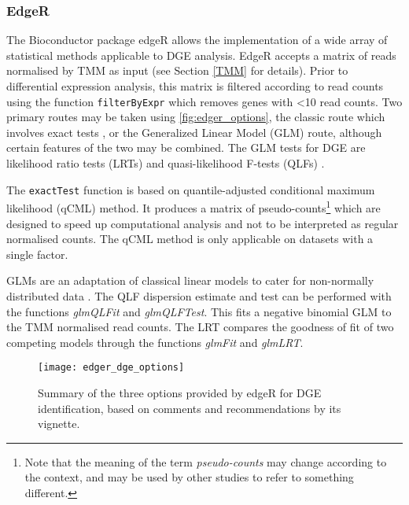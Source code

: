 \subsubsection{EdgeR}

The Bioconductor package edgeR allows the implementation of a wide array of statistical methods applicable to \ac{DGE} analysis. EdgeR accepts a matrix of reads normalised by \ac{TMM} as input (see Section \ref{TMM} for details). Prior to differential expression analysis, this matrix is filtered according to read counts using the function \texttt{filterByExpr} which removes genes with <10 read counts. Two primary routes may be taken using \autoref{fig:edger_options}, the classic route which involves exact tests \citep{robinson2007moderated, robinson2008small}, or the Generalized Linear Model (GLM) route, although certain features of the two may be combined. The GLM tests for \ac{DGE} are likelihood ratio tests (LRTs) \citep{mccarthy2012differential} and quasi-likelihood F-tests (QLFs) \citep{lun2016s, lund2012detecting}.

The \texttt{exactTest} function is based on quantile-adjusted conditional maximum likelihood (qCML) method. It produces a matrix of pseudo-counts\footnote{Note that the meaning of the term \textit{pseudo-counts} may change according to the context, and may be used by other studies to refer to something different.} which are designed to speed up computational analysis and not to be interpreted as regular normalised counts. The qCML method is only applicable on datasets with a single factor.

GLMs are an adaptation of classical linear models to cater for non-normally distributed data \citep{dunn2018generalized}. The QLF dispersion estimate and test can be performed with the functions \textit{glmQLFit} and \textit{glmQLFTest}. This fits a negative binomial GLM to the \ac{TMM} normalised read counts. The LRT compares the goodness of fit of two competing models through the functions \textit{glmFit} and \textit{glmLRT}.

\begin{figure}[h!]
    \centering
    \texttt{[image: edger\_dge\_options]}
    \caption[Summary of the options provided by edgeR for DGE identification]{Summary of the three options provided by edgeR for \ac{DGE} identification, based on comments and recommendations by its vignette. } 
    \label{fig:edger_options}
\end{figure}

